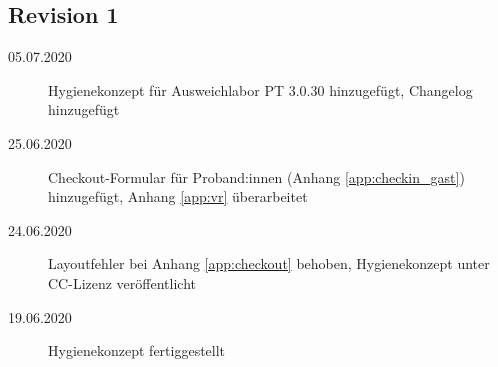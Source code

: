 \documentclass[hidelinks,12pt]{extarticle}
\begin{document}
\subsection*{Revision 1}

\begin{description}
    \item[05.07.2020] Hygienekonzept für Ausweichlabor PT 3.0.30 hinzugefügt, Changelog hinzugefügt
    \item[25.06.2020] Checkout-Formular für Proband:innen (Anhang \ref{app:checkin_gast}) hinzugefügt, Anhang \ref{app:vr} überarbeitet
    \item[24.06.2020] Layoutfehler bei Anhang \ref{app:checkout} behoben, Hygienekonzept unter CC-Lizenz veröffentlicht
    \item[19.06.2020] Hygienekonzept fertiggestellt


\end{description}

\newpage
\tableofcontents 














\end{document}
